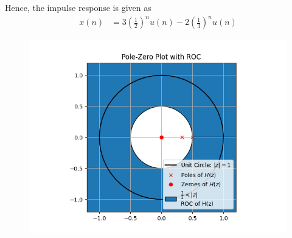 \documentclass[journal,12pt,twocolumn]{IEEEtran}
\begin{document}
Hence, the impulse response is given as
\begin{align}
    x(n) &= 3\left(\frac{1}{2}\right)^nu(n) - 2\left(\frac{1}{3}\right)^nu(n)
\end{align}
\begin{figure}[h]
    \centering
    \includegraphics[scale=0.54]{Figure_1.png}
    \label{fig:my_label}
\end{figure}
\end{document}
